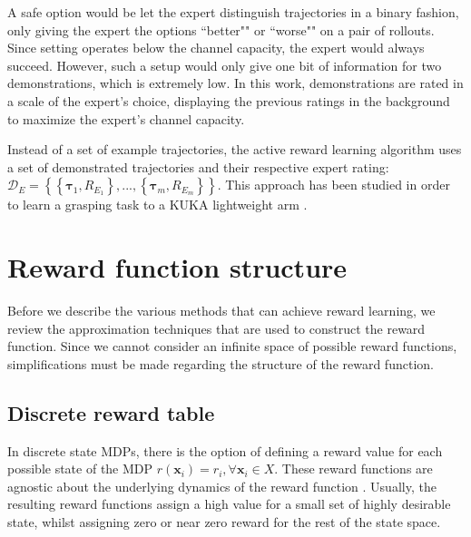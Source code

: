 \documentclass[mscThesis.tex]{subfiles}
\begin{document}
A safe option would be let the expert distinguish trajectories in a binary fashion, only giving the expert the options ``better"" or ``worse"" on a pair of rollouts. Since setting operates below the channel capacity, the expert would always succeed. However, such a setup would only give one bit of information for two demonstrations, which is extremely low. In this work, demonstrations are rated in a scale of the expert's choice, displaying the previous ratings in the background to maximize the expert's channel capacity.

Instead of a set of example trajectories, the active reward learning algorithm uses a set of demonstrated trajectories and their respective expert rating: $\mathcal{D}_E = \left\{ \left\{ \bm{\tau}_1, R_{E_1} \right\}, ..., \left\{ \bm{\tau}_m, R_{E_m} \right\} \right\}$. This approach has been studied in order to learn a grasping task to a KUKA lightweight arm \cite{Daniel2014}.


\section{Reward function structure}
\label{sec:rewardstruct}
Before we describe the various methods that can achieve reward learning, we review the approximation techniques that are used to construct the reward function. Since we cannot consider an infinite space of possible reward functions, simplifications must be made regarding the structure of the reward function. 

\subsection{Discrete reward table}
In discrete state MDPs, there is the option of defining a reward value for each possible state of the MDP $r( \bm{x}_i) = r_{i},  \forall  \bm{x}_i \in X $. These reward functions are agnostic about the underlying dynamics of the reward function \cite{AbbeelRussel2000} \cite{RamachandranAmir2007}. Usually, the resulting reward functions assign a high value for a small set of highly desirable state, whilst assigning zero or near zero reward for the rest of the state space. 
\end{document}
